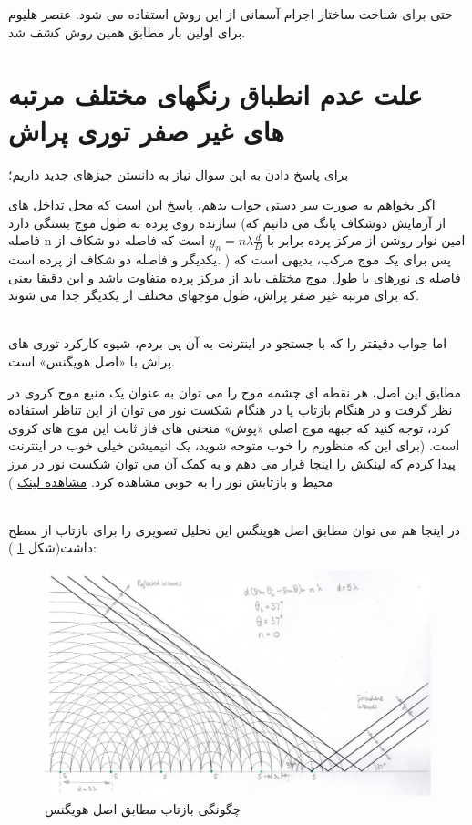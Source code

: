 \documentclass{article}
\begin{document}
حتی برای شناخت ساختار اجرام آسمانی از این روش استفاده می شود. عنصر هلیوم برای اولین بار مطابق همین روش کشف شد.
\section{علت عدم انطباق رنگهای مختلف مرتبه های غیر صفر توری پراش}
برای پاسخ دادن به این سوال نیاز به دانستن چیزهای جدید داریم؛ 

اگر بخواهم به صورت سر دستی جواب بدهم، پاسخ این است که محل تداخل های سازنده روی پرده به طول موج بستگی دارد (از آزمایش دوشکاف یانگ می دانیم که فاصله n امین نوار روشن از مرکز پرده برابر با 
$y_n = n \lambda \frac{d}{D}$
است که 
فاصله دو شکاف از یکدیگر و 
فاصله دو شکاف از پرده است.
)
پس برای یک موج مرکب، بدیهی است که فاصله ی نورهای با طول موج مختلف باید از مرکز پرده متفاوت باشد و این دقیقا یعنی که برای مرتبه غیر صفر پراش، طول موجهای مختلف از یکدیگر جدا می شوند.

\noindent\\
اما جواب دقیقتر را که با جستجو در اینترنت به آن پی بردم، شیوه کارکرد توری های پراش با «اصل هویگنس» است.

مطابق این اصل، هر نقطه ای چشمه موج را می توان به عنوان یک منبع موج کروی در نظر گرفت و در هنگام بازتاب یا در هنگام شکست نور می توان از این تناظر استفاده کرد، توجه کنید که جبهه موج اصلی «پوش»  منحنی های فاز ثابت این موج های کروی است. (برای این که منظورم را خوب متوجه شوید، یک انیمیشن خیلی خوب در اینترنت پیدا کردم که لینکش را اینجا قرار می دهم و به کمک آن می توان شکست نور در مرز محیط و بازتابش نور را به خوبی مشاهده کرد.
\href{https://www.walter-fendt.de/html5/phen/refractionhuygens_en.htm}{مشاهده لینک}
)

\noindent\\
در اینجا هم می توان مطابق اصل هوینگس این تحلیل تصویری را برای بازتاب از سطح داشت(شکل 
\ref{Fig1}
):
\begin{figure}
	\centering
	\includegraphics[width=\linewidth]{1.jpg}
	\caption{چگونگی بازتاب مطابق اصل هویگنس}
	\label{Fig1}
\end{figure}
\end{document}

